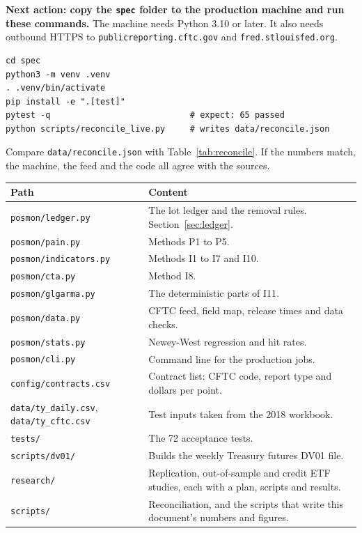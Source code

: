 \documentclass[11pt,a4paper]{article}
\newcommand{\code}[1]{\nolinkurl{#1}}
\newcommand{\sublabel}[1]{\par\vspace{3pt}\needspace{3\baselineskip}{\sffamily\small\bfseries #1}\par\nopagebreak[4]\vspace{1pt}}
\newcommand{\TestCount}{72}
\begin{document}
\textbf{Next action: copy the \code{spec} folder to the production machine and run these commands.} The machine needs Python 3.10 or later. It also needs outbound HTTPS to \code{publicreporting.cftc.gov} and \code{fred.stlouisfed.org}.

\begin{lstlisting}[style=shell]
cd spec
python3 -m venv .venv
. .venv/bin/activate
pip install -e ".[test]"
pytest -q                            # expect: 65 passed
python scripts/reconcile_live.py     # writes data/reconcile.json
\end{lstlisting}

Compare \code{data/reconcile.json} with Table~\ref{tab:reconcile}. If the numbers match, the machine, the feed and the code all agree with the sources.

\sublabel{What is in the folder}
\small
\begin{tabularx}{\linewidth}{@{}lX@{}}
\toprule
Path & Content \\
\midrule
\code{posmon/ledger.py} & The lot ledger and the removal rules. Section~\ref{sec:ledger}. \\
\code{posmon/pain.py} & Methods P1 to P5. \\
\code{posmon/indicators.py} & Methods I1 to I7 and I10. \\
\code{posmon/cta.py} & Method I8. \\
\code{posmon/glgarma.py} & The deterministic parts of I11. \\
\code{posmon/data.py} & CFTC feed, field map, release times and data checks. \\
\code{posmon/stats.py} & Newey-West regression and hit rates. \\
\code{posmon/cli.py} & Command line for the production jobs. \\
\code{config/contracts.csv} & Contract list: CFTC code, report type and dollars per point. \\
\code{data/ty_daily.csv}, \code{data/ty_cftc.csv} & Test inputs taken from the 2018 workbook. \\
\code{tests/} & The \TestCount{} acceptance tests. \\
\code{scripts/dv01/} & Builds the weekly Treasury futures DV01 file. \\
\code{research/} & Replication, out-of-sample and credit ETF studies, each with a plan, scripts and results. \\
\code{scripts/} & Reconciliation, and the scripts that write this document's numbers and figures. \\
\bottomrule
\end{tabularx}
\normalsize
\end{document}
